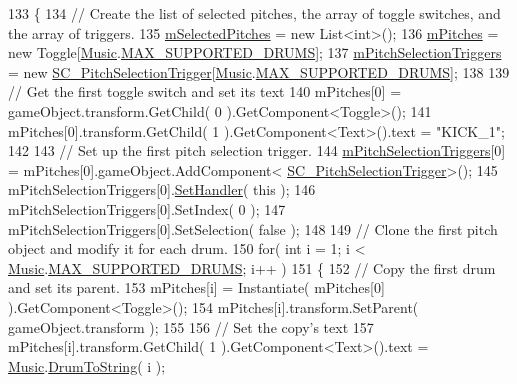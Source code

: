 \begin{DoxyCode}
133     \{
134         \textcolor{comment}{// Create the list of selected pitches, the array of toggle switches, and the array of triggers.}
135         \hyperlink{group___s_c___p_s_c_priv_var_ga5a8a5c31158f6af7f0c17d4fd03c5641}{mSelectedPitches} = \textcolor{keyword}{new} List<int>();
136         \hyperlink{group___s_c___p_s_c_priv_var_ga25180add92621da773b024083d3a61af}{mPitches} = \textcolor{keyword}{new} Toggle[\hyperlink{class_music}{Music}.\hyperlink{group___music_constants_gabce1a1ac5b9b6355af6bd7fb3868467a}{MAX\_SUPPORTED\_DRUMS}];
137         \hyperlink{group___s_c___p_s_c_priv_var_ga8431846d376b98bc6de5a872cce2c596}{mPitchSelectionTriggers} = \textcolor{keyword}{new} 
      \hyperlink{class_s_c___pitch_selection_trigger}{SC\_PitchSelectionTrigger}[\hyperlink{class_music}{Music}.\hyperlink{group___music_constants_gabce1a1ac5b9b6355af6bd7fb3868467a}{MAX\_SUPPORTED\_DRUMS}];
138 
139         \textcolor{comment}{// Get the first toggle switch and set its text}
140         mPitches[0] = gameObject.transform.GetChild( 0 ).GetComponent<Toggle>();
141         mPitches[0].transform.GetChild( 1 ).GetComponent<Text>().text = \textcolor{stringliteral}{"KICK\_1"};
142 
143         \textcolor{comment}{// Set up the first pitch selection trigger.}
144         \hyperlink{group___s_c___p_s_c_priv_var_ga8431846d376b98bc6de5a872cce2c596}{mPitchSelectionTriggers}[0] = mPitches[0].gameObject.AddComponent<
      \hyperlink{class_s_c___pitch_selection_trigger}{SC\_PitchSelectionTrigger}>();
145         mPitchSelectionTriggers[0].\hyperlink{group___s_c___p_s_t_pub_func_ga0b334518dbdac5874adf9436cd2c7fed}{SetHandler}( \textcolor{keyword}{this} );
146         mPitchSelectionTriggers[0].SetIndex( 0 );
147         mPitchSelectionTriggers[0].SetSelection( \textcolor{keyword}{false} );
148 
149         \textcolor{comment}{// Clone the first pitch object and modify it for each drum.}
150         \textcolor{keywordflow}{for}( \textcolor{keywordtype}{int} i = 1; i < \hyperlink{class_music}{Music}.\hyperlink{group___music_constants_gabce1a1ac5b9b6355af6bd7fb3868467a}{MAX\_SUPPORTED\_DRUMS}; i++ )
151         \{
152             \textcolor{comment}{// Copy the first drum and set its parent.}
153             mPitches[i] = Instantiate( mPitches[0] ).GetComponent<Toggle>();
154             mPitches[i].transform.SetParent( gameObject.transform );
155 
156             \textcolor{comment}{// Set the copy's text}
157             mPitches[i].transform.GetChild( 1 ).GetComponent<Text>().text = 
      \hyperlink{class_music}{Music}.\hyperlink{group___music_stat_func_gaf5f64ebe9a7e036e07f283e41f26d22b}{DrumToString}( i );

\end{DoxyCode}
